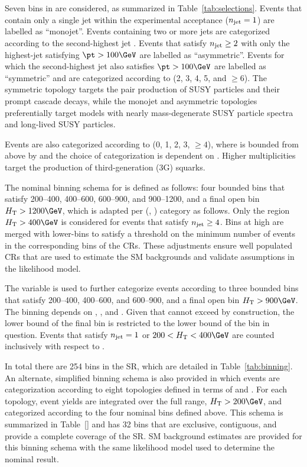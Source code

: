 Seven bins in \njet are considered, as summarized in
Table~\ref{tab:selections}. Events that contain only a single jet
within the experimental acceptance ($n_{\text{jet}} = 1$) are labelled as
``monojet''. Events containing two or more jets are categorized
according to the second-highest jet \pt. Events that satisfy $n_{\text{jet}}
\geq 2$ with only the highest-\pt jet satisfying $\pt > 100\GeV$ are
labelled as ``asymmetric''. Events for which the second-highest jet
\pt also satisfies $\pt > 100\GeV$ are labelled as ``symmetric'' and
are categorized according to \njet (2, 3, 4, 5, and ${\geq}6$). The
symmetric topology targets the pair production of SUSY particles and
their prompt cascade decays, while the monojet and asymmetric
topologies preferentially target models with nearly mass-degenerate
SUSY particle spectra and long-lived SUSY particles.

Events are also categorized according to \nb (0, 1, 2, 3, ${\geq}4$),
where \nb is bounded from above by \njet and the choice of
categorization is dependent on \njet. Higher \nb multiplicities target
the production of third-generation (3G) squarks. 

The nominal binning schema for \scalht is defined as follows: four
bounded bins that satisfy 200--400, 400--600, 600--900, and
900--1200\GeV, and a final open bin $\scalht > 1200\GeV$, which is
adapted per (\njet, \nb) category as follows. Only the region $\scalht
> 400\GeV$ is considered for events that satisfy $n_{\text{jet}} \geq 4$. Bins
at high \scalht are merged with lower-\scalht bins to satisfy a
threshold on the minimum number of events in the corresponding bins of
the CRs. These adjustments ensure well populated CRs that are used to
estimate the SM backgrounds and validate assumptions in the likelihood
model.

The \mht variable is used to further categorize events according to
three bounded bins that satisfy 200--400, 400--600, and 600--900, and
a final open bin $\scalht > 900\GeV$. The \mht binning depends on
\njet, \nb, and \scalht. Given that \mht cannot exceed \scalht by
construction, the lower bound of the final \mht bin is restricted to
the lower bound of the \scalht bin in question. Events that satisfy
$n_{\text{jet}} = 1$ or $200 < \scalht < 400\GeV$ are counted inclusively with
respect to \mht.

In total there are 254 bins in the SR, which are detailed in
Table~\ref{tab:binning}. An alternate, simplified binning schema is
also provided in which events are categorization according to eight
topologies defined in terms of \njet and \nb. For each topology, event
yields are integrated over the full \scalht range, $\scalht >
200\GeV$, and categorized according to the four nominal \mht bins
defined above. This schema is summarized in Table~\ref{} and has 32
bins that are exclusive, contiguous, and provide a complete coverage
of the SR. SM background estimates are provided for this binning
schema with the same likelihood model used to determine the nominal
result.

